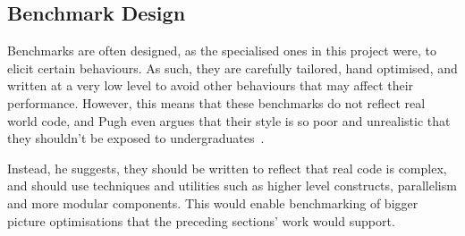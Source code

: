 \subsection{Benchmark Design}

Benchmarks are often designed, as the specialised ones in this project were, to elicit certain behaviours. As such, they are carefully tailored, hand optimised, and written at a very low level to avoid other behaviours that may affect their performance. However, this means that these benchmarks do not reflect real world code, and Pugh even argues that their style is so poor and unrealistic that they shouldn't be exposed to undergraduates~\cite{optimisationrelevant}.

Instead, he suggests, they should be written to reflect that real code is complex, and should use techniques and utilities such as higher level constructs, parallelism and more modular components. This would enable benchmarking of bigger picture optimisations that the preceding sections' work would support.
